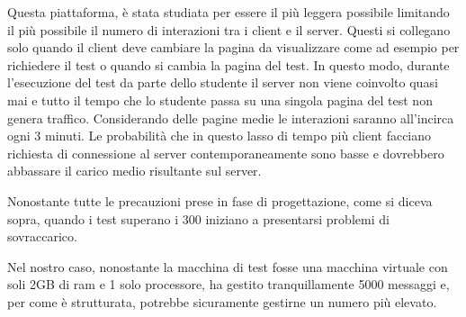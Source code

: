 Questa piattaforma, \`e stata studiata per essere il pi\`u leggera possibile limitando il pi\`u possibile il numero di interazioni tra i client e il server. Questi si collegano solo quando il client deve cambiare la pagina da visualizzare come ad esempio per richiedere il test o quando si cambia la pagina del test. In questo modo, durante l'esecuzione del test da parte dello studente il server non viene coinvolto quasi mai e tutto il tempo che lo studente passa su una singola pagina del test non genera traffico. Considerando delle pagine medie le interazioni saranno all'incirca ogni 3 minuti. Le probabilit\`a che in questo lasso di tempo pi\`u client facciano richiesta di connessione al server contemporaneamente sono basse e dovrebbero abbassare il carico medio risultante sul server.

Nonostante tutte le precauzioni prese in fase di progettazione, come si diceva sopra, quando i test superano i 300 iniziano a presentarsi problemi di sovraccarico.

Nel nostro caso, nonostante la macchina di test fosse una macchina virtuale con soli 2GB di ram e 1 solo processore, ha gestito tranquillamente 5000 messaggi e, per come \`e strutturata, potrebbe sicuramente gestirne un numero pi\`u elevato.